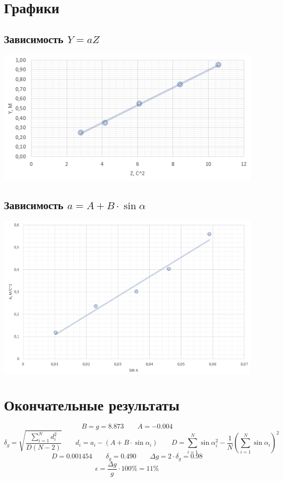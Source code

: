 \documentclass[12pt,a4paper]{article}
\begin{document}
\section{Графики}
\subsection{Зависимость $Y=aZ$}
\begin{center}
    \includegraphics*[width=14cm]{graph_1.png}
\end{center}
\subsection{Зависимость $a=A+B\cdot\sin\alpha$}
\begin{center}
    \includegraphics*[width=14cm]{graph_2.png}
\end{center}
\section{Окончательные результаты}
$$B=g=8.873 \qquad A=-0.004$$
$$\delta_g=\sqrt{\frac{\sum^N_{i=1}d_i^2}{D(N-2)}}\qquad d_i=a_i - (A + B\cdot\sin\alpha_i)\qquad D=\sum^N_{i=1}\sin\alpha_i^2-\frac{1}{N}(\sum^N_{i=1}{\sin \alpha_i})^2$$
$$D=0.001454\qquad\delta_g=0.490\qquad\Delta g = 2\cdot\delta_g = 0.98$$
$$\epsilon=\frac{\Delta g}{g}\cdot 100\%=11\%$$
\end{document}
